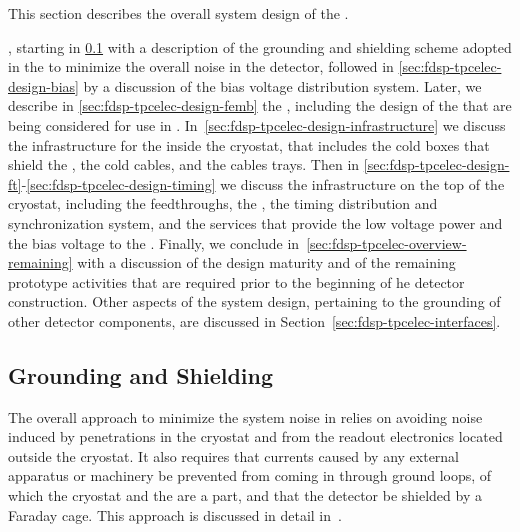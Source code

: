 This section describes the overall
system design of the .


, starting in
\ref{sec:fdsp-tpcelec-design-grounding} with a description of the
grounding and shielding scheme adopted in the  
to minimize the overall noise in the detector, followed in
\ref{sec:fdsp-tpcelec-design-bias} by a discussion of the bias
voltage distribution system. Later, we describe in 
\ref{sec:fdsp-tpcelec-design-femb} the , including
the design of the  that are being considered for
use in . In~\ref{sec:fdsp-tpcelec-design-infrastructure}
we discuss the infrastructure for the  inside the cryostat,
that includes the cold boxes that shield the , the
cold cables, and the cables trays. Then in
\ref{sec:fdsp-tpcelec-design-ft}-\ref{sec:fdsp-tpcelec-design-timing} we discuss 
the infrastructure on the top of the cryostat, including the
feedthroughs, the , the timing distribution and
synchronization system, and the services that provide the low
voltage power and the bias voltage to the . Finally,
we conclude in~\ref{sec:fdsp-tpcelec-overview-remaining}
with a discussion of the design maturity and of
the remaining prototype activities that are required prior to
the beginning of he detector construction. Other aspects of
the system design, pertaining to the grounding of other 
detector components, are discussed in Section~\ref{sec:fdsp-tpcelec-interfaces}.
\subsection{Grounding and Shielding}
\label{sec:fdsp-tpcelec-design-grounding}

The overall approach to minimize the system noise in 
relies on avoiding noise induced by penetrations in the cryostat
and %
from the readout electronics located %
outside the cryostat. %
It also
requires that %
currents caused by any external apparatus or machinery %
be prevented from coming in through ground loops, of
which the cryostat and the  are a part, and that the
detector %
be shielded by a %
Faraday cage. This approach
is discussed in detail in~\cite{radekaNoise}. 

